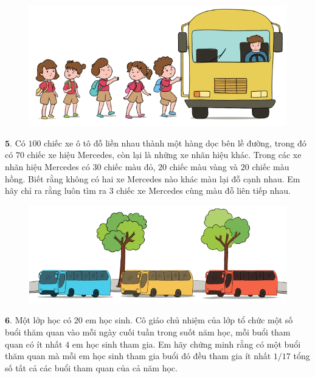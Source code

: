 \begin{multicols}{2}
\begin{figure}[H]
			\captionsetup{labelformat= empty, justification=centering}
			\includegraphics[width=1\linewidth]{Pi5_bai4}
			\vspace*{-10pt}
		\end{figure}
	$\pmb{5.}$ 	Có $100$ chiếc xe ô tô đỗ liền nhau thành một hàng dọc bên lề đường, trong đó có $70$ chiếc xe hiệu Mercedes, còn lại là những xe nhãn hiệu khác. Trong các xe nhãn hiệu Mercedes có $30$ chiếc màu đỏ, $20$ chiếc màu vàng và $20$ chiếc màu hồng. Biết rằng không có hai xe Mercedes nào khác màu lại đỗ cạnh nhau. Em hãy chỉ ra rằng luôn tìm ra $3$ chiếc xe Mercedes cùng màu đỗ liên tiếp nhau.
	\begin{figure}[H]
			\centering
			\vspace*{-5pt}
			\captionsetup{labelformat= empty, justification=centering}
			\includegraphics[width=1\linewidth]{Pi5_bai5}
			\vspace*{-15pt}
		\end{figure}
	$\pmb{6.}$ Một lớp học có $20$ em học sinh. Cô giáo chủ nhiệm của lớp tổ chức một số buổi thăm quan vào mỗi ngày cuối tuần trong suốt năm học, mỗi buổi tham quan có ít nhất $4$ em học sinh tham gia. Em hãy chứng minh rằng có một buổi thăm quan mà mỗi em học sinh tham gia buổi đó đều tham gia ít nhất $1/17$ tổng số tất cả các buổi tham quan của cả năm học.
	\begin{figure}[H]
		\centering
		\vspace*{-5pt}
		\captionsetup{labelformat= empty, justification=centering}

\end{figure}
\end{multicols}
